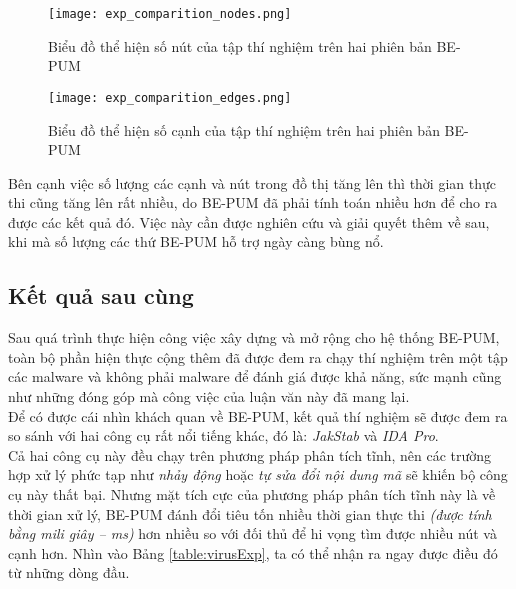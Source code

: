 \newpage
\begin{figure}[htp]
	\begin{center}
		\texttt{[image: exp\_comparition\_nodes.png]}
	\end{center}
	\caption{Biểu đồ thể hiện số nút của tập thí nghiệm trên hai phiên bản BE-PUM}
	\label{fig:exp_comparition_nodes}
\end{figure}

\begin{figure}[htp]
	\begin{center}
		\texttt{[image: exp\_comparition\_edges.png]}
	\end{center}
	\caption{Biểu đồ thể hiện số cạnh của tập thí nghiệm trên hai phiên bản BE-PUM}
	\label{fig:exp_comparition_edges}
\end{figure}

Bên cạnh việc số lượng các cạnh và nút trong đồ thị tăng lên thì thời gian thực thi cũng tăng lên rất nhiều, do BE-PUM đã phải tính toán nhiều hơn để cho ra được các kết quả đó. Việc này cần được nghiên cứu và giải quyết thêm về sau, khi mà số lượng các thứ BE-PUM hỗ trợ ngày càng bùng nổ.

\newpage
	\subsection {Kết quả sau cùng}

Sau quá trình thực hiện công việc xây dựng và mở rộng cho hệ thống BE-PUM, toàn bộ phần hiện thực cộng thêm đã được đem ra chạy thí nghiệm trên một tập các malware và không phải malware để đánh giá được khả năng, sức mạnh cũng như những đóng góp mà công việc của luận văn này đã mang lại. \\

Để có được cái nhìn khách quan về BE-PUM, kết quả thí nghiệm sẽ được đem ra so sánh với hai công cụ rất nổi tiếng khác, đó là: \textit{JakStab} và \textit{IDA Pro}.\\

Cả hai công cụ này đều chạy trên phương pháp phân tích tĩnh, nên các trường hợp xử lý phức tạp như \textit{nhảy động} hoặc \textit{tự sửa đổi nội dung mã} sẽ khiến bộ công cụ này thất bại. Nhưng mặt tích cực của phương pháp phân tích tĩnh này là về thời gian xử lý, BE-PUM đánh đổi tiêu tốn nhiều thời gian thực thi \textit{(được tính bằng mili giây -- ms)} hơn nhiều so với đối thủ để hi vọng tìm được nhiều nút và cạnh hơn. Nhìn vào Bảng \ref{table:virusExp}, ta có thể nhận ra ngay được điều đó từ những dòng đầu. \\

